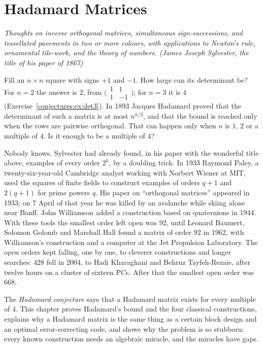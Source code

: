 \chapter{Hadamard Matrices}\label{conjectures:ch:hadamard}

\begin{center}\itshape
Thoughts on inverse orthogonal matrices, simultaneous sign-successions, and tessellated pavements in two or more colours, with applications to
Newton's rule, ornamental tile-work, and the theory of numbers.
\upshape(James Joseph Sylvester, the title of his paper of 1867)
\end{center}

Fill an $n\times n$ square with signs $+1$ and $-1$. How large can its determinant be? For $n=2$ the answer is $2$, from
$\bigl(\begin{smallmatrix}1&1\\1&-1\end{smallmatrix}\bigr)$; for $n=3$ it is $4$ (Exercise~\ref{conjectures:ex:det3}). In 1893 Jacques Hadamard proved that the
determinant of such a matrix is at most $n^{n/2}$, and that the bound is reached only when the rows are pairwise orthogonal. That can happen only when $n$
is $1$, $2$ or a multiple of $4$. Is it enough to be a multiple of $4$?

Nobody knows. Sylvester had already found, in his paper with the wonderful title above, examples of every order $2^k$, by a doubling trick. In 1933
Raymond Paley, a twenty-six-year-old Cambridge analyst working with Norbert Wiener at MIT, used the squares of finite fields to construct examples of
orders $q+1$ and $2(q+1)$ for prime powers $q$. His paper on ``orthogonal matrices'' appeared in 1933; on 7 April of that year he was killed by an
avalanche while skiing alone near Banff. John Williamson added a construction based on quaternions in 1944. With these tools the smallest order
left open was $92$, until Leonard Baumert, Solomon Golomb and Marshall Hall found a matrix of order $92$ in 1962, with Williamson's construction and
a computer at the Jet Propulsion Laboratory. The open orders kept falling, one by one, to cleverer constructions and longer searches: $428$ fell in
2004, to Hadi Kharaghani and Behruz Tayfeh-Rezaie, after twelve hours on a cluster of sixteen PCs. After that the smallest open order was $668$.

The \emph{Hadamard conjecture} says that a Hadamard matrix exists for every multiple of $4$. This chapter proves Hadamard's bound and the four classical
constructions, explains why a Hadamard matrix is the same thing as a certain block design and an optimal error-correcting code, and shows why the
problem is so stubborn: every known construction needs an algebraic miracle, and the miracles have gaps.

